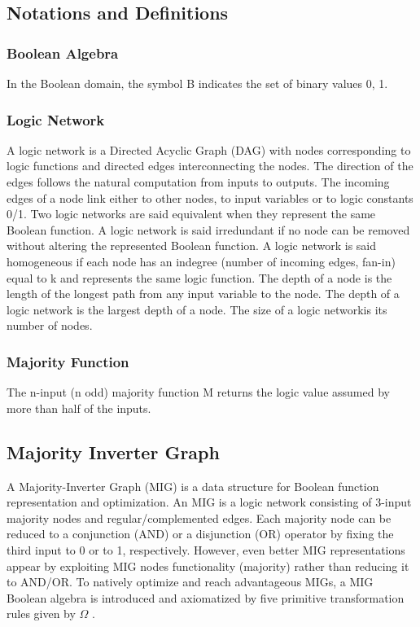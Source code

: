 \documentclass[
	accentcolor=1c,%
	type=intern,
	marginpar=false,
	ruledheaders=section,
	class=report,
	BCOR=5mm,
      parskip=half-,
	fontsize=10pt
	]{tudapub}
\begin{document}
	\subsection{Notations and Definitions}

	\subsubsection{Boolean Algebra}
	In the Boolean domain, the symbol B indicates the set of binary values {0, 1}.
	\newline

	\subsubsection{Logic Network}
	A logic network is a Directed Acyclic Graph (DAG) with nodes corresponding to logic functions
	and directed edges interconnecting the nodes. The direction of the edges follows the natural
	computation from inputs to outputs. The incoming edges of a node link either to other nodes,
	to input variables or to logic constants 0/1. Two logic networks are said equivalent when they
	represent the same Boolean function. A logic network is said irredundant if no node can be
	removed without altering the represented Boolean function. A logic network is said homogeneous
	if each node has an indegree (number of incoming edges, fan-in) equal to k and represents the
	same logic function. The depth of a node is the length of the longest path from any input
	variable to the node. The depth of a logic network is the largest depth of a node.
	The size of a logic networkis its number of nodes.
	\newline

	\subsubsection{Majority Function}
	The n-input (n odd) majority function M returns the logic value assumed by more than half
	of the inputs.
	\newline

	\subsection{Majority Inverter Graph}

	A Majority-Inverter Graph (MIG) is a data structure for Boolean function representation and
	optimization. An MIG is a logic network consisting of 3-input majority nodes and regular/complemented edges. Each majority node can be reduced to a conjunction (AND) or a disjunction (OR) operator by fixing the third input to 0 or to 1, respectively. However, even better MIG representations appear by exploiting MIG nodes functionality (majority) rather than reducing it to AND/OR. To natively optimize and reach advantageous MIGs, a MIG Boolean algebra is introduced and axiomatized by five primitive transformation rules given by $\Omega$ .\newline
\end{document}
